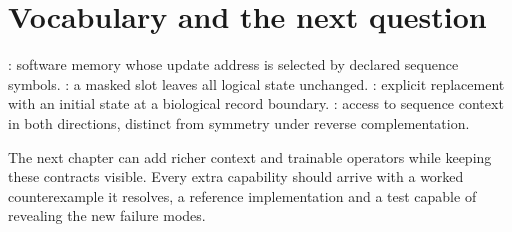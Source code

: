 \section{Vocabulary and the next question}
: software memory whose update address is selected
by declared sequence symbols. : a masked slot leaves
all logical state unchanged. : explicit replacement with
an initial state at a biological record boundary. :
access to sequence context in both directions, distinct from symmetry under
reverse complementation.

The next chapter can add richer context and trainable operators while keeping
these contracts visible. Every extra capability should arrive with a worked
counterexample it resolves, a reference implementation and a test capable of
revealing the new failure modes.
